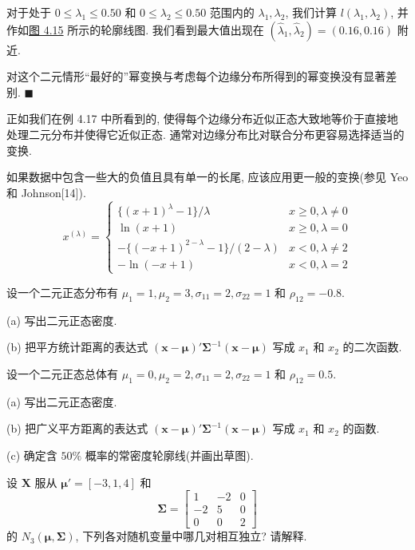 
对于处于 $0 \leq \lambda_1 \leq 0.50$ 和 $0 \leq \lambda_2 \leq 0.50$ 范围内的 $\lambda_1, \lambda_2$, 我们计算 $l(\lambda_1, \lambda_2)$, 并作如\hyperref[fig:4.15]{图 4.15} 所示的轮廓线图. 我们看到最大值出现在 $(\hat{\lambda}_1, \hat{\lambda}_2) = (0.16, 0.16)$ 附近.

\begin{mvfigure}
\label{fig:4.15}
\end{mvfigure}

对这个二元情形“最好的”幂变换与考虑每个边缘分布所得到的幂变换没有显著差别. \hfill$\blacksquare$

正如我们在例 4.17 中所看到的, 使得每个边缘分布近似正态大致地等价于直接地处理二元分布并使得它近似正态. 通常对边缘分布比对联合分布更容易选择适当的变换.

如果数据中包含一些大的负值且具有单一的长尾, 应该应用更一般的变换(参见 Yeo 和 Johnson[14]).
\[
x^{(\lambda)} = \begin{cases} \{(x+1)^\lambda - 1\}/\lambda & x \geq 0, \lambda \neq 0 \\ \ln(x+1) & x \geq 0, \lambda = 0 \\ -\{(-x+1)^{2-\lambda} - 1\}/(2-\lambda) & x < 0, \lambda \neq 2 \\ -\ln(-x+1) & x < 0, \lambda = 2 \end{cases}
\]


\quad 设一个二元正态分布有 $\mu_1 = 1, \mu_2 = 3, \sigma_{11} = 2, \sigma_{22} = 1$ 和 $\rho_{12} = -0.8$.

\noindent (a) 写出二元正态密度.

\noindent (b) 把平方统计距离的表达式 $(\mathbf{x}-\boldsymbol{\mu})'\boldsymbol{\Sigma}^{-1}(\mathbf{x}-\boldsymbol{\mu})$ 写成 $x_1$ 和 $x_2$ 的二次函数.

\quad 设一个二元正态总体有 $\mu_1 = 0, \mu_2 = 2, \sigma_{11} = 2, \sigma_{22} = 1$ 和 $\rho_{12} = 0.5$.

\noindent (a) 写出二元正态密度.

\noindent (b) 把广义平方距离的表达式 $(\mathbf{x}-\boldsymbol{\mu})'\boldsymbol{\Sigma}^{-1}(\mathbf{x}-\boldsymbol{\mu})$ 写成 $x_1$ 和 $x_2$ 的函数.

\noindent (c) 确定含 $50\%$ 概率的常密度轮廓线(并画出草图).

\quad 设 $\mathbf{X}$ 服从 $\boldsymbol{\mu}' = [-3, 1, 4]$ 和
\[
\boldsymbol{\Sigma} = \begin{bmatrix} 1 & -2 & 0 \\ -2 & 5 & 0 \\ 0 & 0 & 2 \end{bmatrix}
\]
的 $N_3(\boldsymbol{\mu}, \boldsymbol{\Sigma})$, 下列各对随机变量中哪几对相互独立? 请解释.
